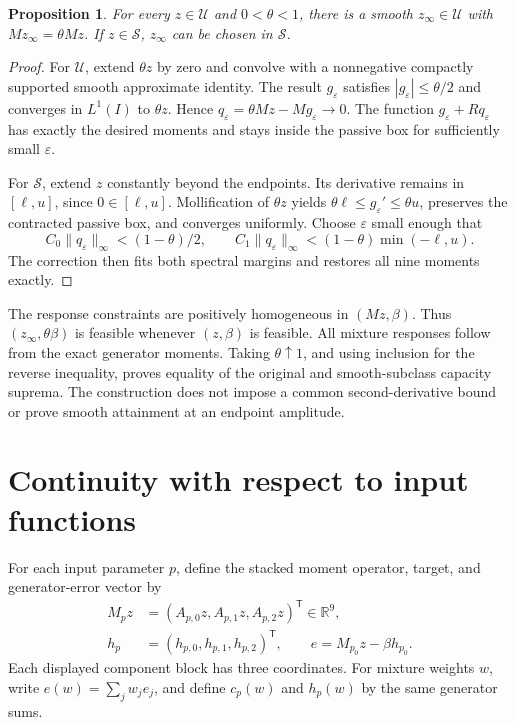 \documentclass[9pt]{osa-supplemental-document}
\newtheorem{proposition}{Proposition}
\begin{document}
\begin{proposition}
For every $z\in\mathcal U$ and $0<\theta<1$, there is a smooth $z_\infty\in\mathcal U$ with $Mz_\infty=\theta Mz$. If $z\in\mathcal S$, $z_\infty$ can be chosen in $\mathcal S$.
\end{proposition}
\begin{proof}
For $\mathcal U$, extend $\theta z$ by zero and convolve with a nonnegative compactly supported smooth approximate identity. The result $g_\varepsilon$ satisfies $|g_\varepsilon|\leq\theta/2$ and converges in $L^1(I)$ to $\theta z$. Hence $q_\varepsilon=\theta Mz-Mg_\varepsilon\to0$. The function $g_\varepsilon+Rq_\varepsilon$ has exactly the desired moments and stays inside the passive box for sufficiently small $\varepsilon$.

For $\mathcal S$, extend $z$ constantly beyond the endpoints. Its derivative remains in $[\ell,u]$, since $0\in[\ell,u]$. Mollification of $\theta z$ yields $\theta\ell\leq g_\varepsilon'\leq\theta u$, preserves the contracted passive box, and converges uniformly. Choose $\varepsilon$ small enough that
\begin{equation}
 C_0\|q_\varepsilon\|_\infty<(1-\theta)/2,\qquad
 C_1\|q_\varepsilon\|_\infty<(1-\theta)\min(-\ell,u).
\end{equation}
The correction then fits both spectral margins and restores all nine moments exactly.
\end{proof}

The response constraints are positively homogeneous in $(Mz,\beta)$. Thus $(z_\infty,\theta\beta)$ is feasible whenever $(z,\beta)$ is feasible. All mixture responses follow from the exact generator moments. Taking $\theta\uparrow1$, and using inclusion for the reverse inequality, proves equality of the original and smooth-subclass capacity suprema. The construction does not impose a common second-derivative bound or prove smooth attainment at an endpoint amplitude.

\section{Continuity with respect to input functions}
For each input parameter $p$, define the stacked moment operator, target, and generator-error vector by
\begin{align}
 M_pz&=(A_{p,0}z,A_{p,1}z,A_{p,2}z)^{\mathsf T}\in\mathbb R^9,\\
 h_p&=(h_{p,0},h_{p,1},h_{p,2})^{\mathsf T},\qquad
 e=M_{p_0}z-\beta h_{p_0}.
\end{align}
Each displayed component block has three coordinates. For mixture weights $w$, write $e(w)=\sum_jw_je_j$, and define $c_p(w)$ and $h_p(w)$ by the same generator sums.
\end{document}
